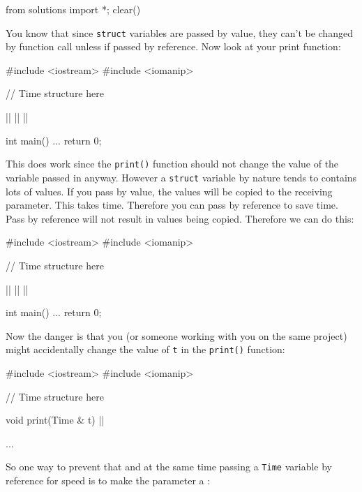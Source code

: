 \begin{python0}
from solutions import *; clear()
\end{python0}

You know that since \texttt{struct} variables are passed by value, they
can't be changed by function call unless if passed by reference. Now look at
your print function:

\begin{consolethree}[escapeinside=||]
#include <iostream>
#include <iomanip>

// Time structure here

||
|\EMPHASIZE{\{}|
|\EMPHASIZE{\}}|

int main()
{
  ...
  return 0;
}
\end{consolethree}

This does work since the \texttt{print()} function should not change the value
of the variable passed in anyway. However a \texttt{struct} variable by nature
tends to contains lots of values. If you pass by value, the values will be
copied to the receiving parameter. This takes time. Therefore you can
pass by reference to save time. Pass by reference will not result in
values being copied. Therefore we can do this:

\begin{consolethree}[escapeinside=||]
#include <iostream>
#include <iomanip>

// Time structure here

||
|\EMPHASIZE{\{}|
|\EMPHASIZE{\}}|

int main()
{
  ...
  return 0;
}
\end{consolethree}

Now the danger is that you (or someone working with you on the same
project) might accidentally change the value of \texttt{t} in the \texttt{print()}
function:

\begin{consolethree}[escapeinside=||]
#include <iostream>
#include <iomanip>

// Time structure here

void print(Time & t)
{
    ||
}

...
\end{consolethree}

So one way to prevent that and at the same time passing a \texttt{Time}
variable by reference for speed is to make the parameter a
:

